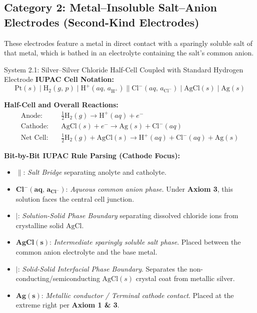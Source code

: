 \documentclass[10pt,a4paper]{article}
\begin{document}
\subsection{Category 2: Metal--Insoluble Salt--Anion Electrodes (Second-Kind Electrodes)}
These electrodes feature a metal in direct contact with a sparingly soluble salt of that metal, which is bathed in an electrolyte containing the salt's common anion.

\begin{examplebox}{System 2.1: Silver--Silver Chloride Half-Cell Coupled with Standard Hydrogen Electrode}
\textbf{IUPAC Cell Notation:}
\begin{equation*}
    \text{Pt}(s) \mid \text{H}_2(g,\, p) \mid \text{H}^+(aq,\, a_{\text{H}^+}) \parallel \text{Cl}^-(aq,\, a_{\text{Cl}^-}) \mid \text{AgCl}(s) \mid \text{Ag}(s)
\end{equation*}

\textbf{Half-Cell and Overall Reactions:}
\begin{align*}
    \text{Anode:} \quad & \tfrac{1}{2}\text{H}_2(g) \longrightarrow \text{H}^+(aq) + e^- \\
    \text{Cathode:} \quad & \text{AgCl}(s) + e^- \longrightarrow \text{Ag}(s) + \text{Cl}^-(aq) \\
    \text{Net Cell:} \quad & \tfrac{1}{2}\text{H}_2(g) + \text{AgCl}(s) \longrightarrow \text{H}^+(aq) + \text{Cl}^-(aq) + \text{Ag}(s)
\end{align*}

\textbf{Bit-by-Bit IUPAC Rule Parsing (Cathode Focus):}
\begin{itemize}[leftmargin=*]
    \item $\mathbf{\parallel}$: \textit{Salt Bridge} separating anolyte and catholyte.
    \item $\mathbf{Cl^-(aq,\, a_{\text{Cl}^-})}$: \textit{Aqueous common anion phase}. Under \textbf{Axiom 3}, this solution faces the central cell junction.
    \item $\mathbf{\mid}$: \textit{Solution-Solid Phase Boundary} separating dissolved chloride ions from crystalline solid $\text{AgCl}$.
    \item $\mathbf{AgCl(s)}$: \textit{Intermediate sparingly soluble salt phase}. Placed between the common anion electrolyte and the base metal.
    \item $\mathbf{\mid}$: \textit{Solid-Solid Interfacial Phase Boundary}. Separates the non-conducting/semiconducting $\text{AgCl}(s)$ crystal coat from metallic silver.
    \item $\mathbf{Ag(s)}$: \textit{Metallic conductor / Terminal cathode contact}. Placed at the extreme right per \textbf{Axiom 1 \& 3}.
\end{itemize}
\end{examplebox}
\end{document}
